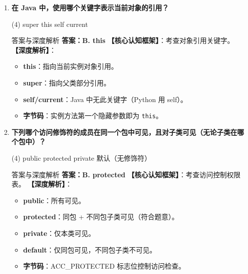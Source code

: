 \documentclass[12pt, a4paper]{ctexart}
\newcommand{\code}[1]{\texttt{#1}}
\begin{document}
\begin{enumerate}[label=\textbf{\arabic*.}, leftmargin=*, itemsep=1.5em]
\item \textbf{在 Java 中，使用哪个关键字表示当前对象的引用？}
\begin{tasks}(4)
    \task super \task this \task self \task current
\end{tasks}
\begin{bluebox}{答案与深度解析}
\textbf{答案：B. this}
\textbf{【核心认知框架】}：考查对象引用关键字。
\textbf{【深度解析】}：
\begin{itemize}[leftmargin=*, nosep]
    \item \textbf{this}：指向当前实例对象引用。
    \item \textbf{super}：指向父类部分引用。
    \item \textbf{self/current}：Java 中无此关键字（Python 用 self）。
    \item \textbf{字节码}：实例方法第一个隐藏参数即为 \code{this}。
\end{itemize}
\end{bluebox}

\item \textbf{下列哪个访问修饰符的成员在同一个包中可见，且对子类可见（无论子类在哪个包中）？}
\begin{tasks}(4)
    \task public \task protected \task private \task 默认（无修饰符）
\end{tasks}
\begin{bluebox}{答案与深度解析}
\textbf{答案：B. protected}
\textbf{【核心认知框架】}：考查访问控制权限表。
\textbf{【深度解析】}：
\begin{itemize}[leftmargin=*, nosep]
    \item \textbf{public}：所有可见。
    \item \textbf{protected}：同包 + 不同包子类可见（符合题意）。
    \item \textbf{private}：仅本类可见。
    \item \textbf{default}：仅同包可见，不同包子类不可见。
    \item \textbf{字节码}：ACC\_PROTECTED 标志位控制访问检查。
\end{itemize}
\end{bluebox}


\end{enumerate}
\end{document}
